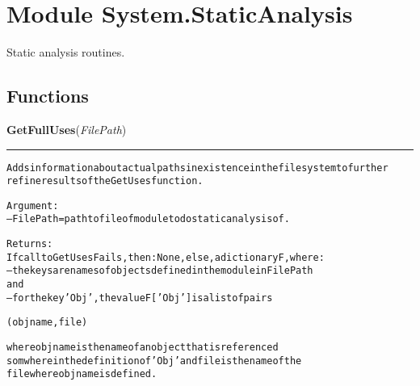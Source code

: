%
%
%


\section{Module System.StaticAnalysis}

    \label{System:StaticAnalysis}
Static analysis routines.



  \subsection{Functions}

    \label{System:StaticAnalysis:GetFullUses}

    \vspace{0.5ex}

\hspace{.8\funcindent}\begin{boxedminipage}{\funcwidth}

    \raggedright \textbf{GetFullUses}(\textit{FilePath})

    \vspace{-1.5ex}

    \rule{\textwidth}{0.5\fboxrule}
\setlength{\parskip}{2ex}
\begin{alltt}

Adds information about actual paths in  existence in the file system to further 
refine results of the GetUses function. 

Argument:
--FilePath = path to file of module to do static analysis of. 
        
Returns:
If call to GetUses Fails, then: None, else, a dictionary F, where:
-- the keys are names of objects defined in the module in FilePath
and
-- for the key 'Obj', the value F['Obj']  is a list of pairs 
        
        (objname,file) 
        
        where objname is the name of an object that is referenced 
        somwhere in the definition of 'Obj' and file is the name of the
        file where objname is defined. 
                
\end{alltt}

\setlength{\parskip}{1ex}
    \end{boxedminipage}


